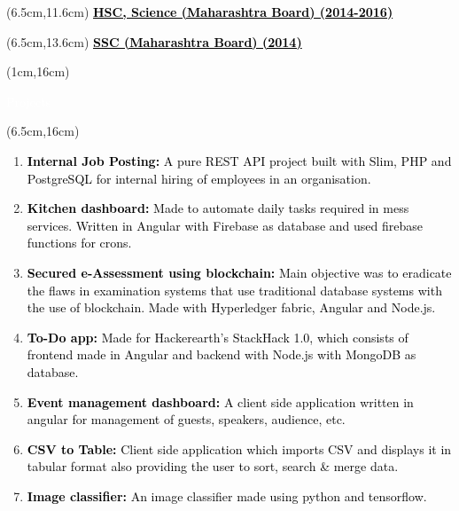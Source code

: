 \documentclass[10pt,a4paper,twocolumn]{article}
\begin{document}
\begin{textblock*}{14cm}(6.5cm,11.6cm)
   \textcolor{black}{\fontsize{15}{20}\selectfont \underline{\textbf{HSC, Science (Maharashtra Board)\hspace{25mm} (2014-2016)}}\vspace{2mm} }
\end{textblock*}
\begin{textblock*}{14cm}(6.5cm,13.6cm)
   \textcolor{black}{\fontsize{15}{20}\selectfont \underline{\textbf{SSC (Maharashtra Board) \hspace{6cm} (2014)}}\vspace{2mm} }
\end{textblock*}
\begin{textblock*}{3.5cm}(1cm,16cm)
   \begin{mdframed}[style=Frame1]
   \textcolor{white}{\fontsize{20}{20}\selectfont Projects}
   \end{mdframed}
\end{textblock*}
\begin{textblock*}{14cm}(6.5cm,16cm)
\begin{enumerate}
    \item \textcolor{black}{\fontsize{14}{20}\selectfont \textbf{Internal Job Posting:} A pure REST API project built with Slim, PHP and PostgreSQL for internal hiring of employees in an organisation.}
    \item \textcolor{black}{\fontsize{14}{20}\selectfont \textbf{Kitchen dashboard:} Made to automate daily tasks required in mess services. Written in Angular with Firebase as database and used firebase functions for crons.}
    \item \textcolor{black}{\fontsize{14}{20}\selectfont \textbf{Secured e-Assessment using blockchain:} Main objective was to eradicate the flaws in examination systems that use traditional database systems with the use of blockchain. Made with Hyperledger fabric, Angular and Node.js.}
    \item \textcolor{black}{\fontsize{14}{20}\selectfont \textbf{To-Do app:} Made for Hackerearth's StackHack 1.0, which consists of frontend made in Angular and backend with Node.js with MongoDB as database.}
    \item \textcolor{black}{\fontsize{14}{20}\selectfont \textbf{Event management dashboard:} A client side application written in angular for management of guests, speakers, audience, etc.}
    \item \textcolor{black}{\fontsize{14}{20}\selectfont \textbf{CSV to Table:} Client side application which imports CSV and displays it in tabular format also providing the user to sort, search \& merge data.}
    \item \textcolor{black}{\fontsize{14}{20}\selectfont \textbf{Image classifier:} An image classifier made using python and tensorflow.}
\end{enumerate}
\end{textblock*}
\end{document}
